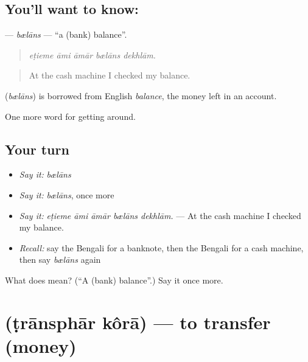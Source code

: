 \subsection*{You'll want to know: }
\textbf{} — \emph{bælāns} — \textquotedblleft{}a (bank) balance\textquotedblright{}.

\begin{quote}
    
\end{quote}

\begin{quote}
\emph{eṭieme āmi āmār bælāns dekhlām.}
\end{quote}

\begin{quote}
At the cash machine I checked my balance.
\end{quote}

\begin{cousinweb}
\textbf{} (\emph{bælāns}) is borrowed from English \emph{balance}, the money left in an account.
\end{cousinweb}

\begin{grammarlens}[title={What you've built}]
One more word for getting around.
\end{grammarlens}

\subsection*{Your turn}
\begin{itemize}
\raggedright
  \item \emph{Say it:} \emph{bælāns}
  \item \emph{Say it:} \emph{bælāns}, once more
  \item \emph{Say it:} \emph{eṭieme āmi āmār bælāns dekhlām.} — At the cash machine I checked my balance.
  \item \emph{Recall:} say the Bengali for a banknote, then the Bengali for a cash machine, then say \emph{bælāns} again
\end{itemize}

\begin{tcolorbox}[breakable,colback=teal!4,colframe=teal!35!black,title={Before you move on}]
What does  mean? (\textquotedblleft{}A (bank) balance\textquotedblright{}.) Say it once more.
\end{tcolorbox}
\section[\texorpdfstring{\bn{ট্রান্সফার} \bn{করা} (ṭrānsphār kôrā)}{ট্রান্সফার করা (ṭrānsphār kôrā)}]{  (ṭrānsphār kôrā) — to transfer (money)}

